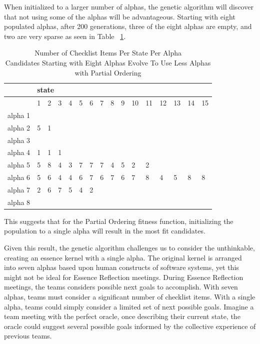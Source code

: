 \documentclass[conference]{IEEEtran}
\begin{document}
When initialized to a larger number of alphas, the genetic algorithm will discover that not using some of the alphas will be advantageous. Starting with eight populated alphas, after 200 generations, three of the eight alphas are empty, and two are very sparse as seen in Table ~\ref{PartialOrderingPrefersLessAlphas}.

\begin{table}
\caption{Number of Checklist Items Per State Per Alpha \\ Candidates Starting with Eight Alphas Evolve To Use Less Alphas with Partial Ordering}
\label{PartialOrderingPrefersLessAlphas}
\centering
\begin{tabular}{|l|l|l|l|l|l|l|l|l|l|l|l|l|l|l|l|}
\hline
 & \multicolumn{15}{l|}{state} \\ \hline
 & 1  & 2  & 3  & 4  & 5  & 6  & 7  & 8  & 9  & 10  & 11  & 12  & 13  & 14  & 15 \\ \hline
alpha 1 &   &   &   &   &   &   &   &   &   &   &   &   &   &   &   \\ \hline
alpha 2 & 5 & 1 &   &   &   &   &   &   &   &   &   &   &   &   &   \\ \hline
alpha 3 &   &   &   &   &   &   &   &   &   &   &   &   &   &   &   \\ \hline
alpha 4 & 1 & 1 & 1 &   &   &   &   &   &   &   &   &   &   &   &   \\ \hline
alpha 5 & 5 & 8 & 4 & 3 & 7 & 7 & 7 & 4 & 5 & 2 & 2 &   &   &   &   \\ \hline
alpha 6 & 5 & 6 & 4 & 4 & 6 & 7 & 6 & 7 & 6 & 7 & 8 & 4 & 5 & 8 & 8 \\ \hline
alpha 7 & 2 & 6 & 7 & 5 & 4 & 2 &   &   &   &   &   &   &   &   &   \\ \hline
alpha 8 &   &   &   &   &   &   &   &   &   &   &   &   &   &   &   \\ \hline
\end{tabular}
\end{table}

This suggests that for the Partial Ordering fitness function, initializing the population to a single alpha will result in the most fit candidates. 

Given this result, the genetic algorithm challenges us to consider the unthinkable, creating an essence kernel with a single alpha. The original kernel is arranged into seven alphas based upon human constructs of software systems, yet this might not be ideal for Essence Reflection meetings. During Essence Reflection meetings, the teams considers possible next goals to accomplish. With seven alphas, teams must consider a significant number of checklist items. With a single alpha, teams could simply consider a limited set of next possible goals. Imagine a team meeting with the perfect oracle, once describing their current state, the oracle could suggest several possible goals informed by the collective experience of previous teams.   
\end{document}
